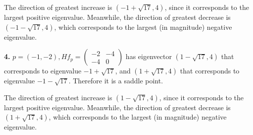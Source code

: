 \documentclass[a4paper, 12pt]{article}
\begin{document}
\begin{solution}
    The direction of greatest increase is $(-1 + \sqrt{17}, 4)$, since it corresponds to the largest positive eigenvalue. Meanwhile, the direction of greatest decrease is $(-1 - \sqrt{17}, 4)$, which corresponds to the largest (in magnitude) negative eigenvalue.

    \textbf{4.} $p = (-1, -2), Hf_p = \begin{pmatrix}
            -2 & -4 \\
            -4 & 0
        \end{pmatrix}$ has eigenvector $(1-\sqrt{17}, 4)$ that corresponds to eigenvalue $-1 + \sqrt{17} $, and $(1 + \sqrt{17}, 4)$ that corresponds to eigenvalue $-1 - \sqrt{17}$. Therefore it is a saddle point.

    The direction of greatest increase is $(1-\sqrt{17}, 4)$, since it corresponds to the largest positive eigenvalue. Meanwhile, the direction of greatest decrease is $(1 + \sqrt{17}, 4)$, which corresponds to the largest (in magnitude) negative eigenvalue.
\end{solution}
\end{document}
